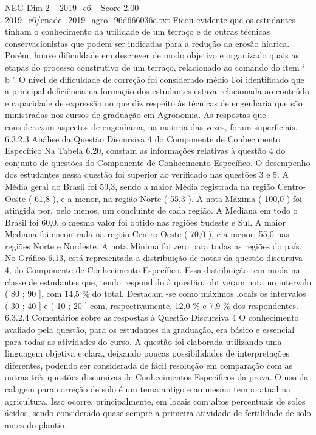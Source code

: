 \begin{textsample}{NEG Dim 2 – 2019\_c6 – Score 2.00 – 2019\_c6/enade\_2019\_agro\_96d666036e.txt}
Ficou evidente que os estudantes tinham o conhecimento da utilidade de um terraço e de outras técnicas conservacionistas que podem ser indicadas para a redução da erosão hídrica.
Porém, houve dificuldade em descrever de modo objetivo e organizado quais as etapas do processo construtivo de um terraço, relacionado ao comando do item ‘ b ’.
O nível de dificuldade de correção foi considerado médio Foi identificado que a principal deficiência na formação dos estudantes estava relacionada ao conteúdo e capacidade de expressão no que diz respeito às técnicas de engenharia que são ministradas nos cursos de graduação em Agronomia.
As respostas que consideravam aspectos de engenharia, na maioria das vezes, foram superficiais. 6.3.2.3 Análise da Questão Discursiva 4 do Componente de Conhecimento Específico Na Tabela 6.20, constam as informações relativas à questão 4 do conjunto de questões do Componente de Conhecimento Específico.
O desempenho dos estudantes nessa questão foi superior ao verificado nas questões 3 e 5.
A Média geral do Brasil foi 59,3, sendo a maior Média registrada na região Centro-Oeste ( 61,8 ), e a menor, na região Norte ( 55,3 ).
A nota Máxima ( 100,0 ) foi atingida por, pelo menos, um concluinte de cada região.
A Mediana em todo o Brasil foi 60,0, o mesmo valor foi obtido nas regiões Sudeste e Sul.
A maior Mediana foi encontrada na região Centro-Oeste ( 70,0 ), e a menor, 55,0 nas regiões Norte e Nordeste.
A nota Mínima foi zero para todas as regiões do país.
No Gráfico 6.13, está representada a distribuição de notas da questão discursiva 4, do Componente de Conhecimento Específico.
Essa distribuição tem moda na classe de estudantes que, tendo respondido à questão, obtiveram nota no intervalo ( 80 ; 90 ], com 14,5 \% do total.
Destacam -se como máximos locais os intervalos ( 30 ; 40 ] e ( 10 ; 20 ] com, respectivamente, 12,0 \% e 7,9 \% dos respondentes. 6.3.2.4 Comentários sobre as respostas à Questão Discursiva 4 O conhecimento avaliado pela questão, para os estudantes da graduação, era básico e essencial para todas as atividades do curso.
A questão foi elaborada utilizando uma linguagem objetiva e clara, deixando poucas possibilidades de interpretações diferentes, podendo ser considerada de fácil resolução em comparação com as outras três questões discursivas de Conhecimentos Específicos da prova.
O uso da calagem para correção de solo é um tema antigo e ao mesmo tempo atual na agricultura.
Isso ocorre, principalmente, em locais com altos percentuais de solos ácidos, sendo considerado quase sempre a primeira atividade de fertilidade de solo antes do plantio.

\end{textsample}
